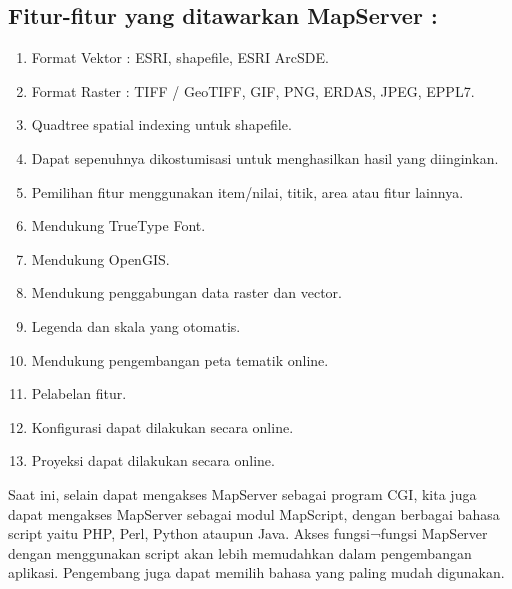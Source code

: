 \subsection{Fitur-fitur yang ditawarkan MapServer :}
 \begin{enumerate}
\item Format Vektor : ESRI, shapefile, ESRI ArcSDE.
\item Format Raster : TIFF / GeoTIFF, GIF, PNG, ERDAS, JPEG, EPPL7.
\item Quadtree spatial indexing untuk shapefile.
\item Dapat sepenuhnya dikostumisasi untuk menghasilkan hasil yang diinginkan.
\item Pemilihan fitur menggunakan item/nilai, titik, area atau fitur lainnya.
\item Mendukung TrueType Font.
\item Mendukung OpenGIS.
\item Mendukung penggabungan data raster dan vector.
\item Legenda dan skala yang otomatis.
\item Mendukung pengembangan peta tematik online.
\item Pelabelan fitur.
\item Konfigurasi dapat dilakukan secara online.
\item Proyeksi dapat dilakukan secara online.
\end{enumerate}
Saat ini, selain dapat mengakses MapServer sebagai program CGI, kita juga dapat mengakses MapServer sebagai modul MapScript, dengan berbagai bahasa script  yaitu PHP, Perl, Python ataupun Java. Akses fungsi¬fungsi MapServer dengan menggunakan script akan lebih memudahkan dalam pengembangan aplikasi. Pengembang juga dapat memilih bahasa yang paling mudah digunakan.

